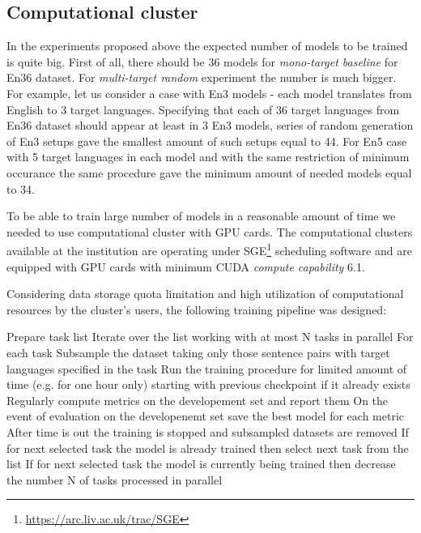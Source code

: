 \subsection{Computational cluster}

In the experiments proposed above the expected number of models to be trained is quite big.
First of all, there should be 36 models for \textit{mono-target baseline} for En\to{}36 dataset.
For \textit{multi-target random} experiment the number is much bigger.
For example, let us consider a case with En\to{}3 models - each model translates from English to 
3 target languages. Specifying that each of 36 target languages from En\to{}36 dataset
should appear at least in 3 En\to{}3 models, series of random generation of En\to{}3 setups gave
the smallest amount of such setups equal to 44. For En\to{}5 case with 5 target languages in each
model and with the same restriction of minimum occurance the same procedure gave the
minimum amount of needed models equal to 34.

To be able to train large number of models in a reasonable amount of time we needed to use
computational cluster with GPU cards.
The computational clusters available at the institution are operating under
SGE\footnote{\url{https://arc.liv.ac.uk/trac/SGE}} scheduling software and are equipped with
GPU cards with minimum CUDA \textit{compute capability} 6.1.

Considering data storage quota limitation and high utilization of computational resources by
the cluster's users, the following training pipeline was designed:

\begin{outline}
    \1 Prepare task list
    \1 Iterate over the list working with at most N tasks in parallel
    \1 For each task
        \2 Subsample the dataset taking only those sentence pairs with target languages
	   specified in the task
	\2 Run the training procedure for limited amount of time (e.g. for one hour only)
	   starting with previous checkpoint if it already exists
	\2 Regularly compute metrics on the developement set and report them
	\2 On the event of evaluation on the developenemt set save the best model for each metric
	\2 After time is out the training is stopped and subsampled datasets are removed
    \1 If for next selected task the model is already trained then select next task from the list
    \1 If for next selected task the model is currently being trained then decrease
       the number N of tasks processed in parallel
\end{outline}


